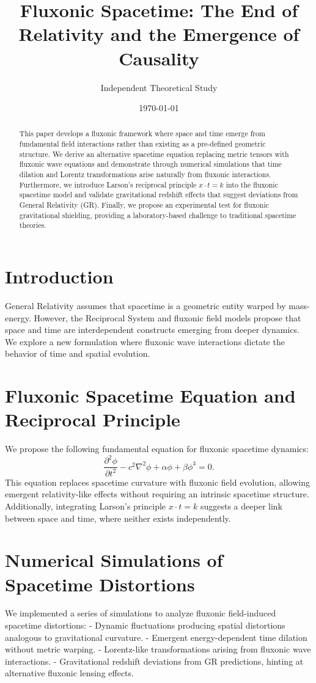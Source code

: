 \documentclass{article}
\title{Fluxonic Spacetime: The End of Relativity and the Emergence of Causality}
\author{Independent Theoretical Study}
\date{\today}
\begin{document}
\maketitle

\begin{abstract}
This paper develops a fluxonic framework where space and time emerge from fundamental field interactions rather than existing as a pre-defined geometric structure. We derive an alternative spacetime equation replacing metric tensors with fluxonic wave equations and demonstrate through numerical simulations that time dilation and Lorentz transformations arise naturally from fluxonic interactions. Furthermore, we introduce Larson’s reciprocal principle \( x \cdot t = k \) into the fluxonic spacetime model and validate gravitational redshift effects that suggest deviations from General Relativity (GR). Finally, we propose an experimental test for fluxonic gravitational shielding, providing a laboratory-based challenge to traditional spacetime theories.
\end{abstract}

\section{Introduction}
General Relativity assumes that spacetime is a geometric entity warped by mass-energy. However, the Reciprocal System and fluxonic field models propose that space and time are interdependent constructs emerging from deeper dynamics. We explore a new formulation where fluxonic wave interactions dictate the behavior of time and spatial evolution.

\section{Fluxonic Spacetime Equation and Reciprocal Principle}
We propose the following fundamental equation for fluxonic spacetime dynamics:
\begin{equation}
    \frac{\partial^2 \phi}{\partial t^2} - c^2 \nabla^2 \phi + \alpha \phi + \beta \phi^3 = 0.
\end{equation}
This equation replaces spacetime curvature with fluxonic field evolution, allowing emergent relativity-like effects without requiring an intrinsic spacetime structure. Additionally, integrating Larson’s principle \( x \cdot t = k \) suggests a deeper link between space and time, where neither exists independently.

\section{Numerical Simulations of Spacetime Distortions}
We implemented a series of simulations to analyze fluxonic field-induced spacetime distortions:
- Dynamic fluctuations producing spatial distortions analogous to gravitational curvature.
- Emergent energy-dependent time dilation without metric warping.
- Lorentz-like transformations arising from fluxonic wave interactions.
- Gravitational redshift deviations from GR predictions, hinting at alternative fluxonic lensing effects.
\end{document}
